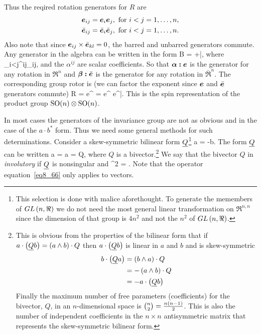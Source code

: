 Thus the reqired rotation generators for $R$ are
\begin{align}
	\bm{e}_{ij} &= \bm{e}_{i}\bm{e}_{j}, \mbox{ for }i<j=1,\dots,n, \\
	\bar{\bm{e}}_{ij} &= \bar{\bm{e}}_{i}\bar{\bm{e}}_{j}, \mbox{ for }i<j=1,\dots,n.
\end{align}
Also note that since $\bm{e}_{ij}\times\bar{\bm{e}}_{kl} = 0$, the barred and unbarred generators commute. Any generator
in the algebra can be written in the form
\be
	B = \alphab\edot\eb+\betab\edot\bar{\eb},
\ee
where
\be\label{colon_sum}
	\alphab\edot\eb \equiv \sum_{i<j}\alpha^{ij}\eb_{ij},
\ee
and the $\alpha^{ij}$ are scalar coefficients. So that $\bm{\alpha}\bm{:}\bm{e}$ is the generator for any rotation in $\Re^{n}$ and $\bm{\beta}\bm{:}\bar{\bm{e}}$ is the generator for any rotation in $\bar{\Re}^{n}$. The corresponding
group rotor is (we can factor the exponent since $\bm{e}$ and $\bar{\bm{e}}$ generators commute)
\be
	R = e^{\shalf\paren{\alphab\edot\eb+\betab\edot\bar{\eb}}} = e^{\shalf \alphab\edot\eb}
	                                                             e^{\shalf\betab\edot\bar{\eb}}.
\ee
This is the spin representation of the product group ${\mbox{SO}\!}\left ( {n} \right )\otimes{\mbox{SO}\!}\left ( {n} \right )$.

In most cases the generators of the invariance group are not as obvious and in the case of the $a\cdot b^{*}$
form.  Thus we need some general methods for such determinations.  Consider a skew-symmetric bilinear form 
$\underline{Q}$\footnote{This selection is done with malice aforethought.  To generate the memembers of $GL\left ( {n,\Re} \right )$
we do not need the most general linear transformation on $\Re^{n,n}$ since the dimension of that group is $4n^{2}$ and
not the $n^{2}$ of ${GL}\left ( {n,\Re} \right )$.} 
\be
	a\cdot{} = -b\cdot{}.
\ee 
The form $\underline{Q}$ can be written
\be\label{eq8_65}
	a\cdot{} = a\cdot{} = \cdot Q,
\ee
where $Q$ is a bivector.\footnote{This is obvious from the properties of the bilinear form that if
$a\cdot\left ( {\underline{Q}b} \right ) = \left ( {a\wedge b} \right )\cdot Q$ then $a\cdot\left ( {\underline{Q}b} \right )$ is linear in $a$ and $b$ and
is skew-symmetric
\begin{align*}
	b\cdot\left ( {\underline{Q}a} \right ) &= \left ( {b\wedge a} \right )\cdot Q \\
	                        &= -\left ( {a\wedge b} \right )\cdot Q \\
	                        &= -a\cdot\left ( {\underline{Q}b} \right )
\end{align*}
Finally the maximum number of free parameters (coefficients) for the bivector, $Q$, in an $n$-dimensional space is 
$\binom{n}{2} = \frac{n\left ( {n-1} \right )}{2}$.  This is also the number of independent coefficients in the $n\times n$ antisymmetric
matrix that represents the skew-symmetric bilinear form.}  We say that the bivector $Q$ in {\em involutory} if $\underline{Q}$ is nonsingular and
\be\label{eq8_66}
	^{2} = \pm{}.
\ee
Note that the operator equation~\ref{eq8_66} only applies to vectors.


